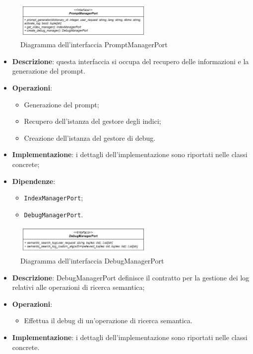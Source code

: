  \label{PromptManagerPort}
\begin{figure}[H]
    \centering
    \includegraphics[width=0.6\textwidth]{assets/Backend/prompt_manager_port.png}
    \caption{Diagramma dell'interfaccia PromptManagerPort}
  \end{figure}
\begin{itemize}
    \item \textbf{Descrizione}: questa interfaccia si occupa del recupero delle informazioni e la generazione del prompt.
    \item \textbf{Operazioni}:
    \begin{itemize}
      \item Generazione del prompt;
      \item Recupero dell'istanza del gestore degli indici;
      \item Creazione dell'istanza del gestore di debug.
    \end{itemize}
    \item \textbf{Implementazione}: i dettagli dell'implementazione sono riportati nelle classi concrete;
    \item \textbf{Dipendenze}:
    \begin{itemize}
        \item \texttt{IndexManagerPort};
        \item \texttt{DebugManagerPort}.
    \end{itemize}
\end{itemize} 

 \label{DebugManagerPort}
\begin{figure}[H]
    \centering
    \includegraphics[width=0.6\textwidth]{assets/Backend/debug_manager_port.png}
    \caption{Diagramma dell'interfaccia DebugManagerPort}
  \end{figure}
\begin{itemize}
    \item \textbf{Descrizione}: DebugManagerPort definisce il contratto per la gestione dei log relativi alle operazioni di ricerca semantica;
    \item \textbf{Operazioni}:
    \begin{itemize}
      \item Effettua il debug di un'operazione di ricerca semantica.
    \end{itemize}
    \item \textbf{Implementazione}: i dettagli dell'implementazione sono riportati nelle classi concrete.
\end{itemize}  

